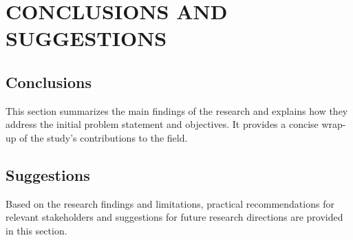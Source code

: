 \chapter{CONCLUSIONS AND SUGGESTIONS}

\section{Conclusions}
This section summarizes the main findings of the research and explains how they address the initial problem statement and objectives. It provides a concise wrap-up of the study's contributions to the field.

\section{Suggestions}
Based on the research findings and limitations, practical recommendations for relevant stakeholders and suggestions for future research directions are provided in this section.

